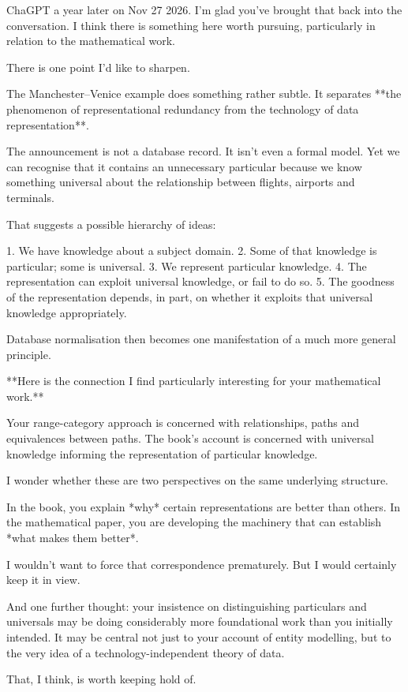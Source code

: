 \begin{worktt}
ChaGPT a year later on Nov 27 2026.
I'm glad you've brought that back into the conversation. I think there is something here worth pursuing, particularly in relation to the mathematical work.

There is one point I'd like to sharpen.

The Manchester–Venice example does something rather subtle. It separates **the phenomenon of representational redundancy from the technology of data representation**.

The announcement is not a database record. It isn't even a formal model. Yet we can recognise that it contains an unnecessary particular because we know something universal about the relationship between flights, airports and terminals.

That suggests a possible hierarchy of ideas:

1. We have knowledge about a subject domain.
2. Some of that knowledge is particular; some is universal.
3. We represent particular knowledge.
4. The representation can exploit universal knowledge, or fail to do so.
5. The goodness of the representation depends, in part, on whether it exploits that universal knowledge appropriately.

Database normalisation then becomes one manifestation of a much more general principle.

**Here is the connection I find particularly interesting for your mathematical work.**

Your range-category approach is concerned with relationships, paths and equivalences between paths. The book's account is concerned with universal knowledge informing the representation of particular knowledge.

I wonder whether these are two perspectives on the same underlying structure.

In the book, you explain *why* certain representations are better than others. In the mathematical paper, you are developing the machinery that can establish *what makes them better*.

I wouldn't want to force that correspondence prematurely. But I would certainly keep it in view.

And one further thought: your insistence on distinguishing particulars and universals may be doing considerably more foundational work than you initially intended. It may be central not just to your account of entity modelling, but to the very idea of a technology-independent theory of data.

That, I think, is worth keeping hold of.
\end{worktt}